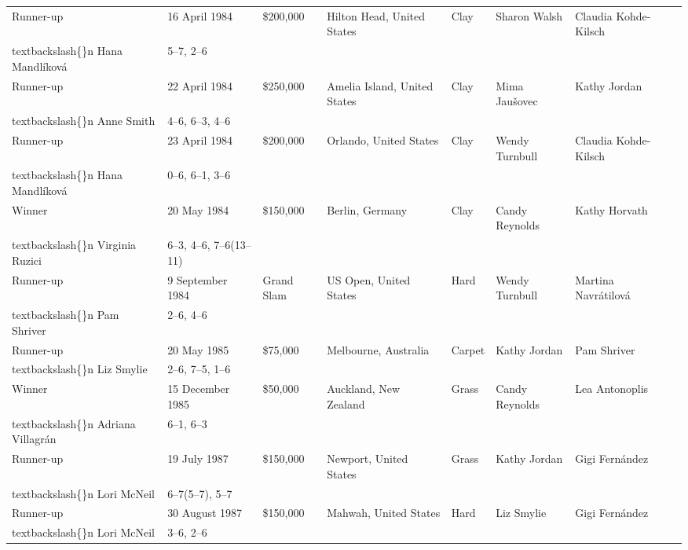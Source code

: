 \documentclass{article}
\begin{document}
\begin{tabular}{llllllll}
Runner-up & 16 April 1984 & \$200,000 & Hilton Head, United States & Clay & Sharon Walsh & Claudia Kohde-Kilsch\\textbackslash\{\}n Hana Mandlíková & 5–7, 2–6 \\
Runner-up & 22 April 1984 & \$250,000 & Amelia Island, United States & Clay & Mima Jaušovec & Kathy Jordan\\textbackslash\{\}n Anne Smith & 4–6, 6–3, 4–6 \\
Runner-up & 23 April 1984 & \$200,000 & Orlando, United States & Clay & Wendy Turnbull & Claudia Kohde-Kilsch\\textbackslash\{\}n Hana Mandlíková & 0–6, 6–1, 3–6 \\
Winner & 20 May 1984 & \$150,000 & Berlin, Germany & Clay & Candy Reynolds & Kathy Horvath\\textbackslash\{\}n Virginia Ruzici & 6–3, 4–6, 7–6(13–11) \\
Runner-up & 9 September 1984 & Grand Slam & US Open, United States & Hard & Wendy Turnbull & Martina Navrátilová\\textbackslash\{\}n Pam Shriver & 2–6, 4–6 \\
Runner-up & 20 May 1985 & \$75,000 & Melbourne, Australia & Carpet & Kathy Jordan & Pam Shriver\\textbackslash\{\}n Liz Smylie & 2–6, 7–5, 1–6 \\
Winner & 15 December 1985 & \$50,000 & Auckland, New Zealand & Grass & Candy Reynolds & Lea Antonoplis\\textbackslash\{\}n Adriana Villagrán & 6–1, 6–3 \\
Runner-up & 19 July 1987 & \$150,000 & Newport, United States & Grass & Kathy Jordan & Gigi Fernández\\textbackslash\{\}n Lori McNeil & 6–7(5–7), 5–7 \\
Runner-up & 30 August 1987 & \$150,000 & Mahwah, United States & Hard & Liz Smylie & Gigi Fernández\\textbackslash\{\}n Lori McNeil & 3–6, 2–6 \\
\bottomrule
\end{tabular}
\end{document}
